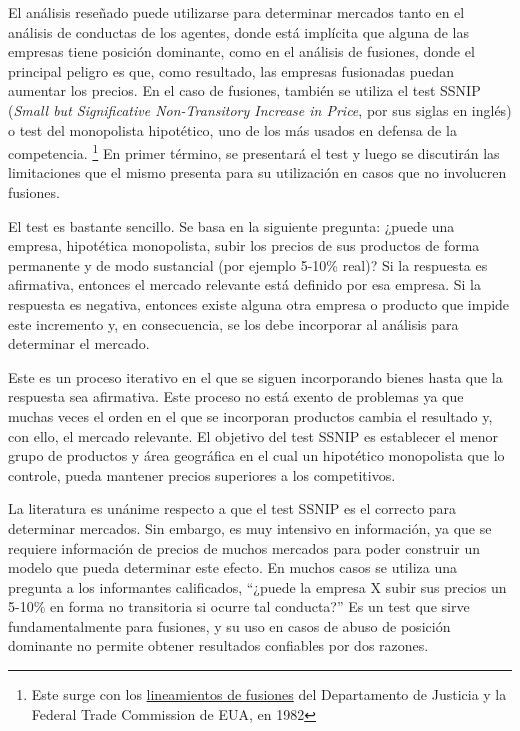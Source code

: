 \documentclass[
  12pt,
  spanish,
]{book}
\begin{document}
El análisis reseñado puede utilizarse para determinar mercados tanto en el análisis de conductas de los agentes, donde está implícita que alguna de las empresas tiene posición dominante, como en el análisis de fusiones, donde el principal peligro es que, como resultado, las empresas fusionadas puedan aumentar los precios. En el caso de fusiones, también se utiliza el test SSNIP (\emph{Small but Significative Non-Transitory Increase in Price}, por sus siglas en inglés) o test del monopolista hipotético, uno de los más usados en defensa de la competencia.
\footnote{Este surge con los \href{https://www.justice.gov/archives/atr/1982-merger-guidelines}{lineamientos de fusiones} del Departamento de Justicia y la Federal Trade Commission de EUA, en 1982}
En primer término, se presentará el test y luego se discutirán las limitaciones que el mismo presenta para su utilización en casos que no involucren fusiones.

El test es bastante sencillo. Se basa en la siguiente pregunta: ¿puede una empresa, hipotética monopolista, subir los precios de sus productos de forma permanente y de modo sustancial (por ejemplo 5-10\% real)? Si la respuesta es afirmativa, entonces el mercado relevante está definido por esa empresa. Si la respuesta es negativa, entonces existe alguna otra empresa o producto que impide este incremento y, en consecuencia, se los debe incorporar al análisis para determinar el mercado.

Este es un proceso iterativo en el que se siguen incorporando bienes hasta que la respuesta sea afirmativa. Este proceso no está exento de problemas ya que muchas veces el orden en el que se incorporan productos cambia el resultado y, con ello, el mercado relevante. El objetivo del test SSNIP es establecer el menor grupo de productos y área geográfica en el cual un hipotético monopolista que lo controle, pueda mantener precios superiores a los competitivos.

La literatura es unánime respecto a que el test SSNIP es el correcto para determinar mercados. Sin embargo, es muy intensivo en información, ya que se requiere información de precios de muchos mercados para poder construir un modelo que pueda determinar este efecto. En muchos casos se utiliza una pregunta a los informantes calificados, ``¿puede la empresa X subir sus precios un 5-10\% en forma no transitoria si ocurre tal conducta?'' Es un test que sirve fundamentalmente para fusiones, y su uso en casos de abuso de posición dominante no permite obtener resultados confiables por dos razones.
\end{document}
